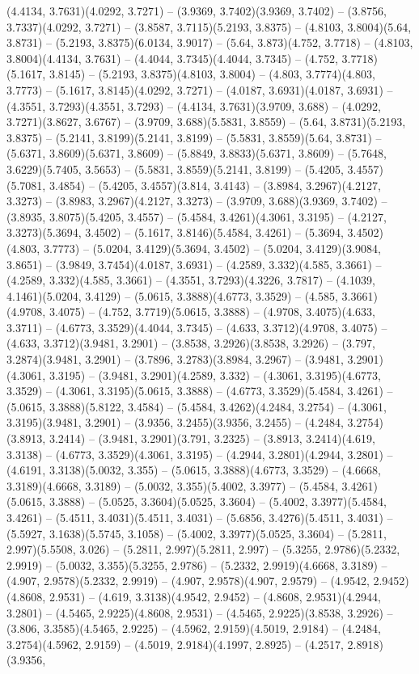 (4.4134, 3.7631)(4.0292, 3.7271) -- (3.9369, 3.7402)(3.9369, 3.7402) -- (3.8756, 3.7337)(4.0292, 3.7271) -- (3.8587, 3.7115)(5.2193, 3.8375) -- (4.8103, 3.8004)(5.64, 3.8731) -- (5.2193, 3.8375)(6.0134, 3.9017) -- (5.64, 3.873)(4.752, 3.7718) -- (4.8103, 3.8004)(4.4134, 3.7631) -- (4.4044, 3.7345)(4.4044, 3.7345) -- (4.752, 3.7718)(5.1617, 3.8145) -- (5.2193, 3.8375)(4.8103, 3.8004) -- (4.803, 3.7774)(4.803, 3.7773) -- (5.1617, 3.8145)(4.0292, 3.7271) -- (4.0187, 3.6931)(4.0187, 3.6931) -- (4.3551, 3.7293)(4.3551, 3.7293) -- (4.4134, 3.7631)(3.9709, 3.688) -- (4.0292, 3.7271)(3.8627, 3.6767) -- (3.9709, 3.688)(5.5831, 3.8559) -- (5.64, 3.8731)(5.2193, 3.8375) -- (5.2141, 3.8199)(5.2141, 3.8199) -- (5.5831, 3.8559)(5.64, 3.8731) -- (5.6371, 3.8609)(5.6371, 3.8609) -- (5.8849, 3.8833)(5.6371, 3.8609) -- (5.7648, 3.6229)(5.7405, 3.5653) -- (5.5831, 3.8559)(5.2141, 3.8199) -- (5.4205, 3.4557)(5.7081, 3.4854) -- (5.4205, 3.4557)(3.814, 3.4143) -- (3.8984, 3.2967)(4.2127, 3.3273) -- (3.8983, 3.2967)(4.2127, 3.3273) -- (3.9709, 3.688)(3.9369, 3.7402) -- (3.8935, 3.8075)(5.4205, 3.4557) -- (5.4584, 3.4261)(4.3061, 3.3195) -- (4.2127, 3.3273)(5.3694, 3.4502) -- (5.1617, 3.8146)(5.4584, 3.4261) -- (5.3694, 3.4502)(4.803, 3.7773) -- (5.0204, 3.4129)(5.3694, 3.4502) -- (5.0204, 3.4129)(3.9084, 3.8651) -- (3.9849, 3.7454)(4.0187, 3.6931) -- (4.2589, 3.332)(4.585, 3.3661) -- (4.2589, 3.332)(4.585, 3.3661) -- (4.3551, 3.7293)(4.3226, 3.7817) -- (4.1039, 4.1461)(5.0204, 3.4129) -- (5.0615, 3.3888)(4.6773, 3.3529) -- (4.585, 3.3661)(4.9708, 3.4075) -- (4.752, 3.7719)(5.0615, 3.3888) -- (4.9708, 3.4075)(4.633, 3.3711) -- (4.6773, 3.3529)(4.4044, 3.7345) -- (4.633, 3.3712)(4.9708, 3.4075) -- (4.633, 3.3712)(3.9481, 3.2901) -- (3.8538, 3.2926)(3.8538, 3.2926) -- (3.797, 3.2874)(3.9481, 3.2901) -- (3.7896, 3.2783)(3.8984, 3.2967) -- (3.9481, 3.2901)(4.3061, 3.3195) -- (3.9481, 3.2901)(4.2589, 3.332) -- (4.3061, 3.3195)(4.6773, 3.3529) -- (4.3061, 3.3195)(5.0615, 3.3888) -- (4.6773, 3.3529)(5.4584, 3.4261) -- (5.0615, 3.3888)(5.8122, 3.4584) -- (5.4584, 3.4262)(4.2484, 3.2754) -- (4.3061, 3.3195)(3.9481, 3.2901) -- (3.9356, 3.2455)(3.9356, 3.2455) -- (4.2484, 3.2754)(3.8913, 3.2414) -- (3.9481, 3.2901)(3.791, 3.2325) -- (3.8913, 3.2414)(4.619, 3.3138) -- (4.6773, 3.3529)(4.3061, 3.3195) -- (4.2944, 3.2801)(4.2944, 3.2801) -- (4.6191, 3.3138)(5.0032, 3.355) -- (5.0615, 3.3888)(4.6773, 3.3529) -- (4.6668, 3.3189)(4.6668, 3.3189) -- (5.0032, 3.355)(5.4002, 3.3977) -- (5.4584, 3.4261)(5.0615, 3.3888) -- (5.0525, 3.3604)(5.0525, 3.3604) -- (5.4002, 3.3977)(5.4584, 3.4261) -- (5.4511, 3.4031)(5.4511, 3.4031) -- (5.6856, 3.4276)(5.4511, 3.4031) -- (5.5927, 3.1638)(5.5745, 3.1058) -- (5.4002, 3.3977)(5.0525, 3.3604) -- (5.2811, 2.997)(5.5508, 3.026) -- (5.2811, 2.997)(5.2811, 2.997) -- (5.3255, 2.9786)(5.2332, 2.9919) -- (5.0032, 3.355)(5.3255, 2.9786) -- (5.2332, 2.9919)(4.6668, 3.3189) -- (4.907, 2.9578)(5.2332, 2.9919) -- (4.907, 2.9578)(4.907, 2.9579) -- (4.9542, 2.9452)(4.8608, 2.9531) -- (4.619, 3.3138)(4.9542, 2.9452) -- (4.8608, 2.9531)(4.2944, 3.2801) -- (4.5465, 2.9225)(4.8608, 2.9531) -- (4.5465, 2.9225)(3.8538, 3.2926) -- (3.806, 3.3585)(4.5465, 2.9225) -- (4.5962, 2.9159)(4.5019, 2.9184) -- (4.2484, 3.2754)(4.5962, 2.9159) -- (4.5019, 2.9184)(4.1997, 2.8925) -- (4.2517, 2.8918)(3.9356, 